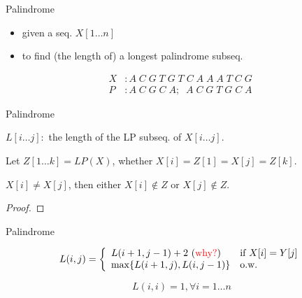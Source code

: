 \documentclass{beamer}
\newcommand{\fig}[2]
{
  \begin{figure}[htp]
	  \centering
	  \texttt{[image: figure/\#2]}
  \end{figure}
}
\begin{document}
\begin{frame}{Palindrome}
  \begin{problem}[Palindrome]
    \begin{itemize}
      \item given a seq. $X[1 \ldots n]$
      \item to find (the length of) a longest palindrome subseq.
    \end{itemize}
    
    \vspace{0.50cm}
    \begin{mdframed}[leftmargin = 2.0cm, rightmargin = 2.0cm]
      \begin{align*}
        X &: A\; C\; G\; T\; G\; T\; C\; A\; A\; A\; T\; C\; G\;  \\
        P &: A\; C\; G\; C\; A; \;\; A\; C\; G\; T\; G\; C\; A
      \end{align*}
    \end{mdframed}
  \end{problem}
\end{frame}
\begin{frame}{Palindrome}
  \begin{mdframed}[rightmargin = 1.5cm]
    $L[i \ldots j]:$ the length of the LP subseq. of $X[i \ldots
    j]$.
  \end{mdframed}
  
  \vspace{0.50cm}
   Let $Z[1 \ldots k] = LP(X)$, whether $X[i] = Z[1] = X[j]
  = Z[k]$. 
  \begin{theorem}[Recurrence]
     $X[i] \neq X[j]$, then either $X[i] \notin Z$ or $X[j] \notin Z$.
  \end{theorem}
  
  \begin{proof}
  \end{proof}
\end{frame}
\begin{frame}{Palindrome}
  \begin{theorem}[Recurrence]
    \begin{displaymath}
      L(i,j) = \left\{
        \begin{array}{ll}
          L(i+1,j-1) + 2 \textrm{ (\textcolor{red}{why?})} & \textrm{if } X[i]
          = Y[j]
          \\
          \max \{ L(i+1,j), L(i, j-1) \} & \textrm{o.w.}
        \end{array}
      \right.
    \end{displaymath}
    
    \vspace{0.50cm}
    \[ L(i,i) = 1, \forall i = 1 \ldots n \]
  \end{theorem}
\end{frame}
\end{document}
